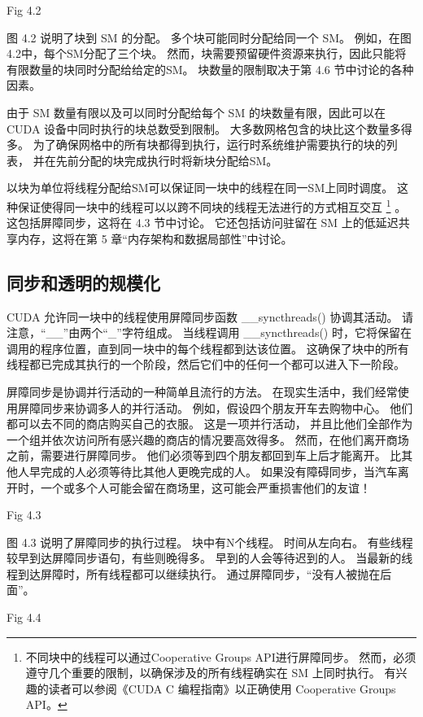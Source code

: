 {\color{red} Fig 4.2}

图 4.2 说明了块到 SM 的分配。 多个块可能同时分配给同一个 SM。 例如，在图4.2中，每个SM分配了三个块。 
然而，块需要预留硬件资源来执行，因此只能将有限数量的块同时分配给给定的SM。 块数量的限制取决于第 4.6 节中讨论的各种因素。

由于 SM 数量有限以及可以同时分配给每个 SM 的块数量有限，因此可以在 CUDA 设备中同时执行的块总数受到限制。 
大多数网格包含的块比这个数量多得多。 为了确保网格中的所有块都得到执行，运行时系统维护需要执行的块的列表，
并在先前分配的块完成执行时将新块分配给SM。

以块为单位将线程分配给SM可以保证同一块中的线程在同一SM上同时调度。 
这种保证使得同一块中的线程可以以跨不同块的线程无法进行的方式相互交互
\footnote{不同块中的线程可以通过Cooperative Groups API进行屏障同步。 
然而，必须遵守几个重要的限制，以确保涉及的所有线程确实在 SM 上同时执行。 
有兴趣的读者可以参阅《CUDA C 编程指南》以正确使用 Cooperative Groups API。} 。
这包括屏障同步，这将在 4.3 节中讨论。 
它还包括访问驻留在 SM 上的低延迟共享内存，这将在第 5 章“内存架构和数据局部性”中讨论。

\subsection{同步和透明的规模化}
CUDA 允许同一块中的线程使用屏障同步函数 \_\_syncthreads() 协调其活动。 请注意，“\_\_”由两个“\_”字符组成。 
当线程调用 \_\_syncthreads() 时，它将保留在调用的程序位置，直到同一块中的每个线程都到达该位置。 
这确保了块中的所有线程都已完成其执行的一个阶段，然后它们中的任何一个都可以进入下一阶段。

屏障同步是协调并行活动的一种简单且流行的方法。 在现实生活中，我们经常使用屏障同步来协调多人的并行活动。 
例如，假设四个朋友开车去购物中心。 他们都可以去不同的商店购买自己的衣服。 这是一项并行活动，
并且比他们全部作为一个组并依次访问所有感兴趣的商店的情况要高效得多。 然而，在他们离开商场之前，需要进行屏障同步。 
他们必须等到四个朋友都回到车上后才能离开。 比其他人早完成的人必须等待比其他人更晚完成的人。 
如果没有障碍同步，当汽车离开时，一个或多个人可能会留在商场里，这可能会严重损害他们的友谊！

{\color{red} Fig 4.3}

图 4.3 说明了屏障同步的执行过程。 块中有N个线程。 时间从左向右。 有些线程较早到达屏障同步语句，有些则晚得多。 
早到的人会等待迟到的人。 当最新的线程到达屏障时，所有线程都可以继续执行。 通过屏障同步，“没有人被抛在后面”。

{\color{red} Fig 4.4}

